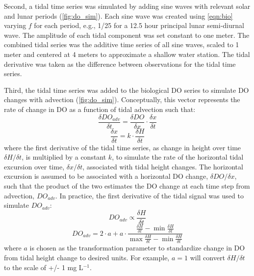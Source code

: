 \documentclass{article}\usepackage{graphicx, color}
\begin{document}
Second, a tidal time series was simulated by adding sine waves with relevant solar and lunar periods (\cref{fig:do_sim}).  Each sine wave was created using \cref{eqn:bio} varying $f$ for each period, e.g., 1/25 for a 12.5 hour principal lunar semi-diurnal wave.  The amplitude of each tidal component was set constant to one meter.  The combined tidal series was the additive time series of all sine waves, scaled to 1 meter and centered  at 4 meters to approximate a shallow water station.  The tidal derivative was taken as the difference between observations for the tidal time series. 

Third, the tidal time series was added to the biological DO series to simulate DO changes with advection (\cref{fig:do_sim}). Conceptually, this vector represents the rate of change in DO as a function of tidal advection such that:
\begin{equation}
\frac{\delta DO_{adv}}{\delta t} = \frac{\delta DO}{\delta x} \cdot \frac{\delta x}{\delta t}
\end{equation}
\begin{equation}
\frac{\delta x}{\delta t} = k \cdot \frac{\delta H}{\delta t}
\end{equation}
where the first derivative of the tidal time series, as change in height over time $\delta H / \delta t$, is multiplied by a constant $k$, to simulate the rate of the horizontal tidal excursion over time, $\delta x / \delta t$,  associated with tidal height changes.  The horizontal excursion is assumed to be associated with a horizontal DO change, $\delta DO / \delta x$, such that the product of the two estimates the DO change at each time step from advection, $DO_{adv}$. In practice, the first derivative of the tidal signal was used to simulate $DO_{adv}$:
\begin{equation}
DO_{adv} \propto \frac{\delta H}{\delta t}
\end{equation}
\begin{equation}
DO_{adv} = 2\cdot a + a \cdot \frac{\frac{\delta H}{\delta t} - \min\frac{\delta H}{\delta t}}{\max\frac{\delta H}{\delta t} - \min\frac{\delta H}{\delta t}}
\end{equation}
where $a$ is chosen as the transformation parameter to standardize change in DO from tidal height change to desired units.  For example, $a = 1$ will convert $\delta H / \delta t$ to the scale of +/- 1 mg L$^{-1}$.  
\end{document}
